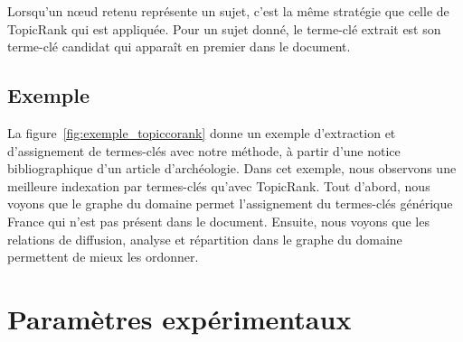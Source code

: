     Lorsqu'un n\oe{}ud retenu représente un sujet, c'est la même stratégie
    que celle de Topic\-Rank qui est appliquée. Pour un sujet donné, le
    terme-clé extrait est son terme-clé candidat qui apparaît en premier
    dans le document.

  \subsection{Exemple}
  \label{subsec:main-domain_specific_keyphrase_annotation-supervised_automatic_keyphrase_extraction-topiccorank-exemple}
    La figure~\ref{fig:exemple_topiccorank} donne un exemple d'extraction et
    d'assignement de termes-clés avec notre méthode, à partir d'une notice
    bibliographique d'un article d'archéologie. Dans cet exemple, nous observons
    une meilleure indexation par termes-clés qu'avec TopicRank. Tout d'abord,
    nous voyons que le graphe du domaine permet l'assignement du termes-clés
    générique \og{}France\fg{} qui n'est pas présent dans le document. Ensuite,
    nous voyons que les relations de \og{}diffusion\fg{}, \og{}analyse\fg{} et
    \og{}répartition\fg{} dans le graphe du domaine permettent de mieux les
    ordonner.
    

\section{Paramètres expérimentaux}
\label{sec:main-domain_specific_keyphrase_annotation-supervised_automatic_keyphrase_annotation-evaluation}

